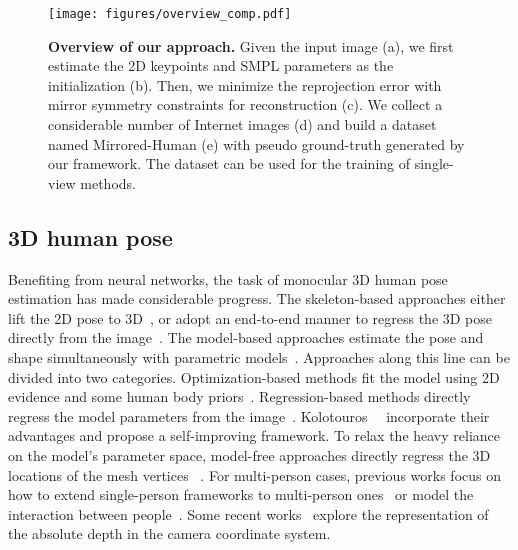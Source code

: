 \begin{figure*}[t]
	\centering
	\texttt{[image: figures/overview\_comp.pdf]}
	\vspace{-0.8cm}
	\caption{\textbf{Overview of our approach.} Given the input image (a), we first estimate the 2D keypoints and SMPL parameters as the initialization (b). Then, we minimize the reprojection error with mirror symmetry constraints for reconstruction (c). We collect a considerable number of Internet images (d) and build a dataset named Mirrored-Human (e) with pseudo ground-truth generated by our framework. The dataset can be used for the training of single-view methods.}
	\label{fig:method}
\end{figure*}

\subsection{3D human pose}
Benefiting from neural networks, the task of monocular 3D human pose estimation has made considerable progress. The skeleton-based approaches either lift the 2D pose to 3D~\cite{martinez_2017_3dbaseline, chen20173d, wandt2019repnet}, or adopt an end-to-end manner to regress the 3D pose directly from the image~\cite{sun2017compositional, sun2018integral, zhou2017towards, pavlakos2018ordinal}. The model-based approaches estimate the pose and shape simultaneously with parametric models~\cite{anguelov2005scape, SMPL:2015, STAR:2020, xu2020ghum}. Approaches along this line can be divided into two categories. Optimization-based methods fit the model using 2D evidence and some human body priors~\cite{Bogo:ECCV:2016, Lassner:UP:2017, SMPL-X:2019, dong2020motion}. Regression-based methods directly regress the model parameters from the image~\cite{hmrKanazawa17, omran2018nbf, xu2019denserac, humanMotionKanazawa19, zeng20203d}. Kolotouros~\etal~\cite{kolotouros2019spin} incorporate their advantages and propose a self-improving framework. To relax the heavy reliance on the model's parameter space, model-free approaches directly regress the 3D locations of the mesh vertices ~\cite{kolotouros2019cmr, Moon_2020_ECCV_I2L-MeshNet,Choi_2020_ECCV_Pose2Mesh}. For multi-person cases, previous works focus on how to extend single-person frameworks to multi-person ones~\cite{rogez2019lcr, mehta2019xnect} or model the interaction between people~\cite{zanfir2018monocular, fieraru3d}. Some recent works~\cite{Moon_2019_ICCV_3DMPPE, zhen2020smap, li2020hmor, lin2020hdnet, fabbri2020compressed} explore the representation of the absolute depth in the camera coordinate system.

